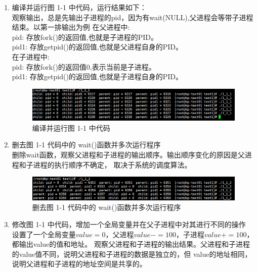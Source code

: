 \documentclass{article}
\begin{document}
    \begin{enumerate}
        \item 编译并运行图 1-1 中代码，运行结果如下：\\
        观察输出，总是先输出子进程的pid，因为有wait(NULL),父进程会等带子进程结束。以第一排输出为例
        在父进程中:\\
        pid: 存放fork()的返回值,也就是子进程的PID。\\
        pid1: 存放getpid()的返回值,也就是父进程自身的PID。\\
        在子进程中:\\
        pid: 存放fork()的返回值0,表示当前是子进程。\\
        pid1: 存放getpid()的返回值,也就是子进程自身的PID。\\
        \newpage
        \begin{figure}[htbp]
            \centering
            \includegraphics[scale=0.8]{picture/2.png}
            \caption{编译并运行图 1-1 中代码}
            \label{2}
        \end{figure} 
        \item 删去图 1-1 代码中的 wait()函数并多次运行程序\\
        删除wait函数，观察父进程和子进程的输出顺序。输出顺序变化的原因是父进程和子进程的执行顺序不确定，
        取决于系统的调度算法。
        \\
        \begin{figure}[htbp]
            \centering
            \includegraphics[scale=0.8]{picture/3.png}
            \caption{删去图 1-1 代码中的 wait()函数并多次运行程序}
            \label{3}
        \end{figure} 
        \item 修改图 1-1 中代码，增加一个全局变量并在父子进程中对其进行不同的操作\\
        设置了一个全局变量$value=0$，父进程$value-=100$，子进程$value+=100$，都输出value的值和地址。
        观察父进程和子进程的输出结果。父进程和子进程的value值不同，说明父进程和子进程的数据是独立的，但
        value的地址相同，说明父进程和子进程的地址空间是共享的。

\end{enumerate}
\end{document}
